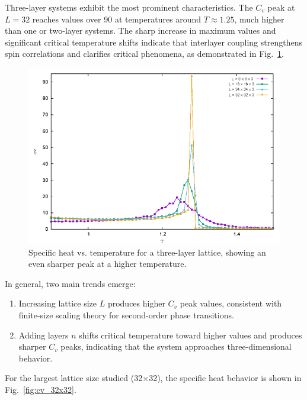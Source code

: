 \documentclass[conference, compsoc, twoside]{IEEEtran}
\begin{document}
Three-layer systems exhibit the most prominent characteristics. The $C_v$ peak at $L = 32$ reaches values over 90 at temperatures around $T \approx 1.25$, much higher than one or two-layer systems. The sharp increase in maximum values and significant critical temperature shifts indicate that interlayer coupling strengthens spin correlations and clarifies critical phenomena, as demonstrated in Fig.~\ref{fig:cv_three_layer}.

\begin{figure}[t]
    \centering
    \includegraphics[width=0.9\columnwidth]{Gambar 11. Cv vs T pada Kisi 3 Lapis.png}
    \caption{Specific heat vs. temperature for a three-layer lattice, showing an even sharper peak at a higher temperature.}
    \label{fig:cv_three_layer}
\end{figure}

In general, two main trends emerge: 
\begin{enumerate}
\item Increasing lattice size $L$ produces higher $C_v$ peak values, consistent with finite-size scaling theory for second-order phase transitions.
\item Adding layers $n$ shifts critical temperature toward higher values and produces sharper $C_v$ peaks, indicating that the system approaches three-dimensional behavior.
\end{enumerate}

For the largest lattice size studied (32×32), the specific heat behavior is shown in Fig.~\ref{fig:cv_32x32}.
\end{document}
